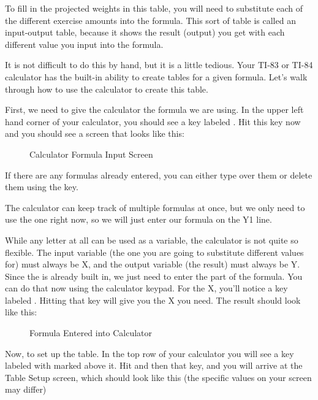 To fill in the projected weights in this table, you will need to substitute each of the different exercise amounts into the formula. This sort of table is called an input-output table, because it shows the result (output) you get with each different value you input into the formula.

It is not difficult to do this by hand, but it is a little tedious. Your TI-83 or TI-84 calculator has the built-in ability to create tables for a given formula. Let’s walk through how to use the calculator to create this table.

First, we need to give the calculator the formula we are using. In the upper left hand corner of your calculator, you should see a key labeled . Hit this key now and you should see a screen that looks like this:

\begin{figure}[ht!]
	\centering
	
	\caption{Calculator Formula Input Screen}
\end{figure}

\FloatBarrier

If there are any formulas already entered, you can either type over them or delete them using the  key.

The calculator can keep track of multiple formulas at once, but we only need to use the one right now, so we will just enter our formula on the Y1 line.

While any letter at all can be used as a variable, the calculator is not quite so flexible. The input variable (the one you are going to substitute different values for) must always be X, and the output variable (the result) must always be Y. Since the  is already built in, we just need to enter the  part of the formula. You can do that now using the calculator keypad. For the X, you’ll notice a key labeled . Hitting that key will give you the X you need. The result should look like this:

\begin{figure}[ht!]
	\centering
	
	\caption{Formula Entered into Calculator}
\end{figure}

\FloatBarrier

Now, to set up the table. In the top row of your calculator you will see a key labeled  with  marked above it. Hit  and then that key, and you will arrive at the Table Setup screen, which should look like this (the specific values on your screen may differ)

